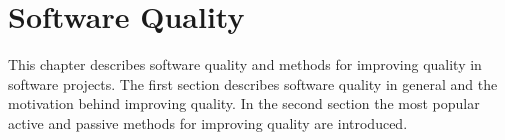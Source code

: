 
 \chapter{Software Quality}
 
This chapter describes software quality and methods for improving quality in software projects. The first section describes software quality in general and the motivation behind improving quality. In the second section the most popular active and passive methods for improving quality are introduced.

 
